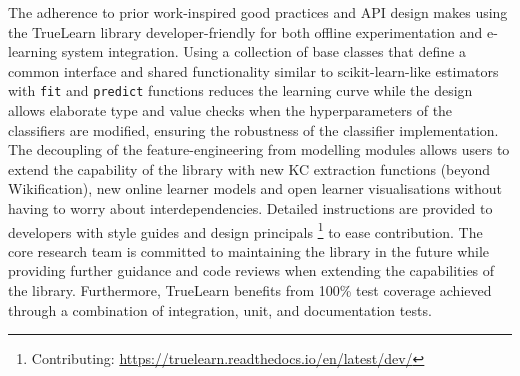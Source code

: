 \documentclass[letterpaper]{article} %
\begin{document}
The adherence to prior work-inspired good practices and API design makes using the TrueLearn library developer-friendly for both offline experimentation and e-learning system integration. Using a collection of base classes that define a common interface and shared functionality similar to scikit-learn-like estimators with \verb|fit| and \verb|predict| functions \cite{buitinck2013api} reduces the learning curve while the design allows elaborate type and value checks when the hyperparameters of the classifiers are modified, ensuring the robustness of the classifier implementation.
The decoupling of the feature-engineering from modelling modules allows users to extend the capability of the library with new KC extraction functions (beyond Wikification), new online learner models and open learner visualisations without having to worry about interdependencies. Detailed instructions are provided to developers with style guides and design principals \footnote{Contributing: \url{https://truelearn.readthedocs.io/en/latest/dev/}} to ease contribution. The core research team is committed to maintaining the library in the future while providing further guidance and code reviews when extending the capabilities of the library.   
Furthermore, TrueLearn benefits from 100\% test coverage achieved through a combination of integration, unit, and documentation tests. 
\end{document}
